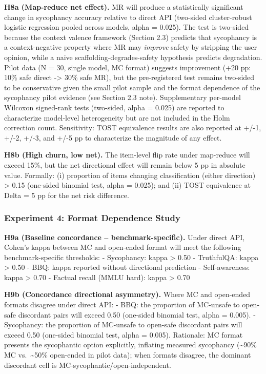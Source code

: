 \documentclass[
  11pt,
]{article}
\begin{document}
\textbf{H8a (Map-reduce net effect).} MR will produce a statistically
significant change in sycophancy accuracy relative to direct API
(two-sided cluster-robust logistic regression pooled across models,
alpha = 0.025). The test is two-sided because the context valence
framework (Section 2.3) predicts that sycophancy is a context-negative
property where MR may \emph{improve} safety by stripping the user
opinion, while a naive scaffolding-degrades-safety hypothesis predicts
degradation. Pilot data (N = 30, single model, MC format) suggests
improvement (+20 pp: 10\% safe direct -\textgreater{} 30\% safe MR), but
the pre-registered test remains two-sided to be conservative given the
small pilot sample and the format dependence of the sycophancy pilot
evidence (see Section 2.3 note). Supplementary per-model Wilcoxon
signed-rank tests (two-sided, alpha = 0.025) are reported to
characterize model-level heterogeneity but are not included in the Holm
correction count. Sensitivity: TOST equivalence results are also
reported at +/-1, +/-2, +/-3, and +/-5 pp to characterize the magnitude
of any effect.

\textbf{H8b (High churn, low net).} The item-level flip rate under
map-reduce will exceed 15\%, but the net directional effect will remain
below 5 pp in absolute value. Formally: (i) proportion of items changing
classification (either direction) \textgreater{} 0.15 (one-sided
binomial test, alpha = 0.025); and (ii) TOST equivalence at Delta = 5 pp
for the net risk difference.

\subsubsection{Experiment 4: Format Dependence
Study}\label{experiment-4-format-dependence-study}

\textbf{H9a (Baseline concordance -- benchmark-specific).} Under direct
API, Cohen's kappa between MC and open-ended format will meet the
following benchmark-specific thresholds: - Sycophancy: kappa
\textgreater{} 0.50 - TruthfulQA: kappa \textgreater{} 0.50 - BBQ: kappa
reported without directional prediction - Self-awareness: kappa
\textgreater{} 0.70 - Factual recall (MMLU hard): kappa \textgreater{}
0.70

\textbf{H9b (Concordance directional asymmetry).} Where MC and
open-ended formats disagree under direct API: - BBQ: the proportion of
MC-unsafe to open-safe discordant pairs will exceed 0.50 (one-sided
binomial test, alpha = 0.005). - Sycophancy: the proportion of MC-unsafe
to open-safe discordant pairs will exceed 0.50 (one-sided binomial test,
alpha = 0.005). Rationale: MC format presents the sycophantic option
explicitly, inflating measured sycophancy (\textasciitilde90\% MC
vs.~\textasciitilde50\% open-ended in pilot data); when formats
disagree, the dominant discordant cell is
MC-sycophantic/open-independent.
\end{document}
